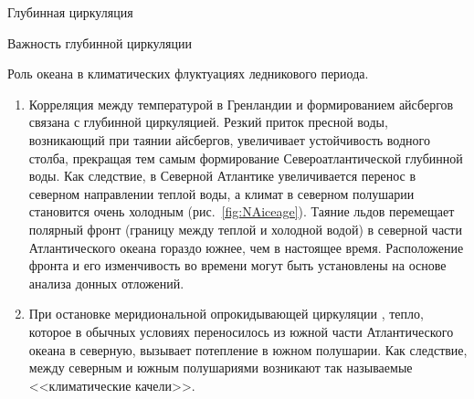 \begin{chapter}{Глубинная циркуляция}
\begin{section}{Важность глубинной циркуляции}
\begin{paragraph}{Роль океана в климатических флуктуациях ледникового периода.}
\begin{enumerate}
\item 
Корреляция между температурой в Гренландии и формированием айсбергов связана
с глубинной циркуляцией. Резкий приток пресной воды, возникающий при таянии
айсбергов, увеличивает устойчивость водного столба, прекращая тем самым 
формирование Североатлантической глубинной 
воды. Как следствие, в Северной 
Атлантике увеличивается перенос в северном 
направлении теплой воды, а климат в северном
полушарии становится очень холодным (рис.~\ref{fig:NAiceage}). 
Таяние льдов перемещает полярный фронт (границу между теплой и холодной водой)
в северной части Атлантического океана гораздо южнее, чем в настоящее время.
Расположение фронта и его изменчивость во времени могут быть установлены
на основе анализа донных отложений.
%

\item 
При остановке меридиональной опрокидывающей циркуляции%
, тепло, которое в обычных 
условиях переносилось из южной части Атлантического океана в северную,
вызывает потепление в южном полушарии. Как следствие, между северным и южным
полушариями возникают так называемые <<климатические качели>>.
%


\end{enumerate}
\end{paragraph}
\end{section}
\end{chapter}
